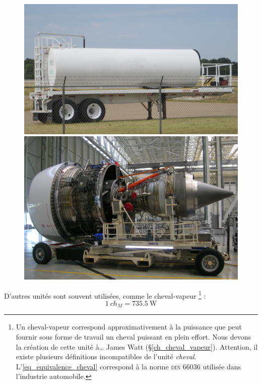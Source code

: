 		\begin{figure}
			\begin{center}
			\includegraphics[height=0.31\textwidth]{images/fueltank.jpg}
			\includegraphics[height=0.31\textwidth]{images/trent900.jpg}
			\end{center}
			\label{fig_energie_puissance}
		\end{figure}
		
		D’autres unités sont souvent utilisées, comme le cheval-vapeur%
			\footnote{Un cheval-vapeur correspond approximativement à la puissance que peut fournir sous forme de travail un cheval puissant en plein effort. Nous devons la création de cette unité à… James Watt (\S\ref{ch_cheval_vapeur}). Attention, il existe plusieurs définitions incompatibles de l’unité \textit{cheval}. L’\cref{eq_equivalence_cheval} correspond à la norme \textsc{din} 66036 utilisée dans l’industrie automobile.} :
		\begin{equation}
			\SI{1}{ch_M} = \SI{735,5}{\watt}
			\label{eq_equivalence_cheval}
		\end{equation}

